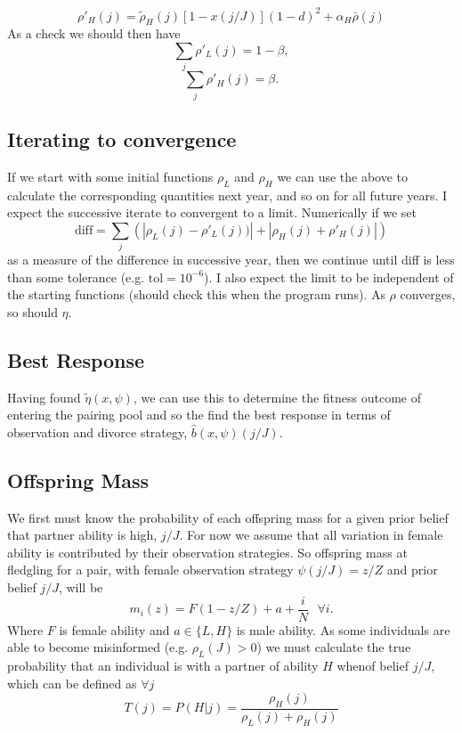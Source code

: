 \documentclass[10pt]{article}
\begin{document}
\begin{equation}
	\rho'_{H}(j)=\tilde{\rho}_{H}(j)[1-x(j/J)](1-d)^{2}+\alpha_{H}\bar{\rho}(j)\label{eq:-3}
\end{equation}
As a check we should then have 
\[
\underset{j}{\boldsymbol{\sum}}\rho'_{L}(j)=1-\beta,
\]
\[
\underset{j}{\boldsymbol{\sum}}\rho'_{H}(j)=\beta.
\]


\subsection{Iterating to convergence }

If we start with some initial functions $\rho_{L}$ and $\rho_{H}$
we can use the above to calculate the corresponding quantities next
year, and so on for all future years. I expect the successive iterate
to convergent to a limit. Numerically if we set 
\[
\text{diff}=\underset{j}{\boldsymbol{\sum}}(|\rho_{L}(j)-\rho'_{L}(j))|+|\rho_{H}(j)+\rho'_{H}(j)|)
\]
as a measure of the difference in successive year, then we continue
until diff is less than some tolerance (e.g. $\text{tol}=10^{-6}$).
I also expect the limit to be independent of the starting functions
(should check this when the program runs). As $\rho$ converges, so
should $\eta$.

\subsection{Best Response}

Having found $\tilde{\eta}(x,\psi)$, we can use this to determine
the fitness outcome of entering the pairing pool and so the find the
best response in terms of observation and divorce strategy, $\hat{b}(x,\psi)(j/J)$. 

\subsection{Offspring Mass}

We first must know the probability of each offspring mass for a given
prior belief that partner ability is high, $j/J$. For now we assume
that all variation in female ability is contributed by their observation
strategies. So offspring mass at fledgling for a pair, with female
observation strategy $\psi(j/J)=z/Z$ and prior belief $j/J$, will
be 
\[
m_{i}(z)=F(1-z/Z)+a+\frac{i}{N}\text{ }\forall i.
\]
Where $F$ is female ability and $a\in\{L,H\}$ is male ability. As
some individuals are able to become misinformed (e.g. $\rho_{L}(J)>0$)
we must calculate the true probability that an individual is with
a partner of ability $H$ whenof belief $j/J$, which can be defined
as $\forall j$
\[
T(j)=P(H|j)=\frac{\rho_{H}(j)}{\rho_{L}(j)+\rho_{H}(j)}
\]
\end{document}
